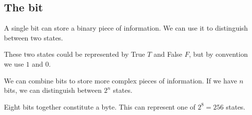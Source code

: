 
\subsection{The bit}

A single bit can store a binary piece of information. We can use it to distinguish between two states.

These two states could be represented by True \(T\) and False \(F\), but by convention we use \(1\) and \(0\).

We can combine bits to store more complex pieces of information. If we have \(n\) bits, we can distinguish between \(2^n\) states.

Eight bits together constitute a byte. This can represent one of \(2^8=256\) states.

